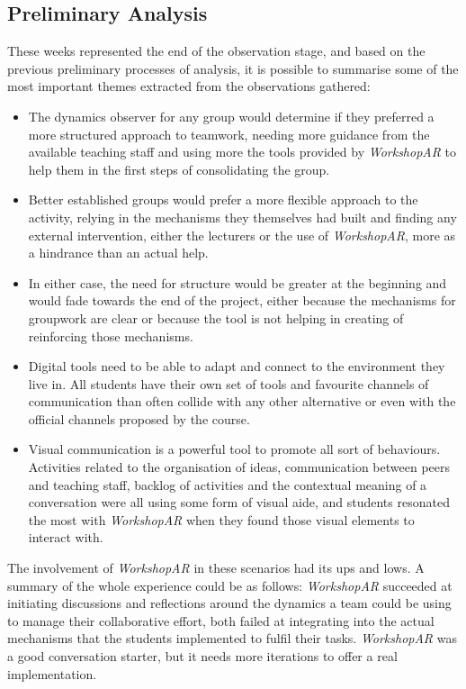 \subsection{Preliminary Analysis \label{sec:6-8-3}}

These weeks represented the end of the observation stage, and based on the previous preliminary processes of analysis, it is possible to summarise some of the most
important themes extracted from the observations gathered:

\begin{itemize}
    \item The dynamics observer for any group would determine if they preferred a more structured approach to teamwork, needing more guidance from the available teaching
    staff and using more the tools provided by \emph{WorkshopAR} to help them in the first steps of consolidating the group.
    \item Better established groups would prefer a more flexible approach to the activity, relying in the mechanisms they themselves had built and finding any external
    intervention, either the lecturers or the use of \emph{WorkshopAR}, more as a hindrance than an actual help.
    \item In either case, the need for structure would be greater at the beginning and would fade towards the end of the project, either because the mechanisms for
    groupwork are clear or because the tool is not helping in creating of reinforcing those mechanisms.
    \item Digital tools need to be able to adapt and connect to the environment they live in. All students have their own set of tools and favourite channels of
    communication than often collide with any other alternative or even with the official channels proposed by the course.
    \item Visual communication is a powerful tool to promote all sort of behaviours. Activities related to the organisation of ideas, communication between peers and
    teaching staff, backlog of activities and the contextual meaning of a conversation were all using some form of visual aide, and students resonated the most with
    \emph{WorkshopAR} when they found those visual elements to interact with.
\end{itemize}

The involvement of \emph{WorkshopAR} in these scenarios had its ups and lows. A summary of the whole experience could be as follows: \emph{WorkshopAR} succeeded at
initiating discussions and reflections around the dynamics a team could be using to manage their collaborative effort, both failed at integrating into the actual
mechanisms that the students implemented to fulfil their tasks. \emph{WorkshopAR} was a good conversation starter, but it needs more iterations to offer a real
implementation.

